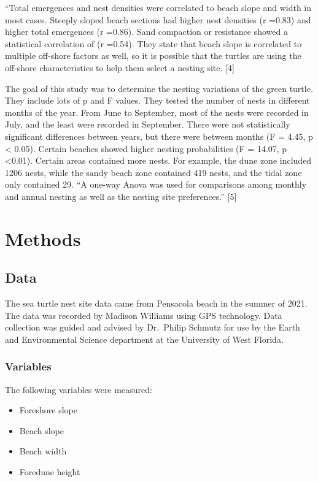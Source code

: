 \documentclass[
]{article}
\providecommand{\tightlist}{%
  \setlength{\itemsep}{0pt}\setlength{\parskip}{0pt}}
\begin{document}
``Total emergences and nest densities were correlated to beach slope and width in most cases. Steeply sloped beach sections had higher nest densities (r =0.83) and higher total emergences (r =0.86). Sand compaction or resistance showed a statistical correlation of (r =0.54). They state that beach slope is correlated to multiple off-shore factors as well, so it is possible that the turtles are using the off-shore characteristics to help them select a nesting site. {[}4{]}

The goal of this study was to determine the nesting variations of the green turtle. They include lots of p and F values. They tested the number of nests in different months of the year. From June to September, most of the nests were recorded in July, and the least were recorded in September. There were not statistically significant differences between years, but there were between months (F = 4.45, p \textless{} 0.05). Certain beaches showed higher nesting probabilities (F = 14.07, p \textless0.01). Certain areas contained more nests. For example, the dune zone included 1206 nests, while the sandy beach zone contained 419 nests, and the tidal zone only contained 29. ``A one-way Anova was used for comparisons among monthly and annual nesting as well as the nesting site preferences.'' {[}5{]}

\hypertarget{methods}{%
\section{Methods}\label{methods}}

\hypertarget{data}{%
\subsection{Data}\label{data}}

The sea turtle nest site data came from Pensacola beach in the summer of 2021. The data was recorded by Madison Williams using GPS technology. Data collection was guided and advised by Dr.~Philip Schmutz for use by the Earth and Environmental Science department at the University of West Florida.

\hypertarget{variables}{%
\subsubsection{Variables}\label{variables}}

The following variables were measured:

\begin{itemize}
\tightlist
\item
  Foreshore slope
\item
  Beach slope
\item
  Beach width
\item
  Foredune height
\end{itemize}
\end{document}
